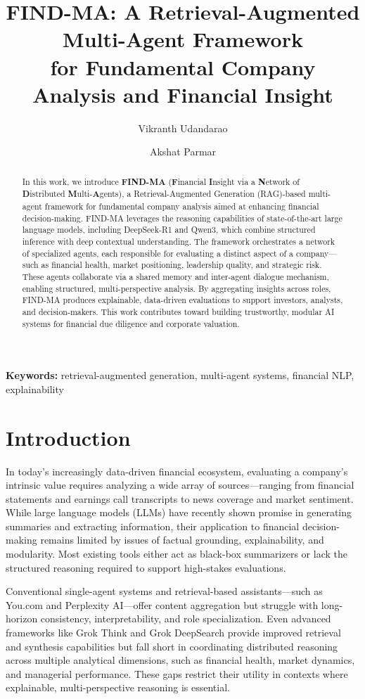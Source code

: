\documentclass[11pt]{article}
\title{FIND-MA: A Retrieval-Augmented Multi-Agent Framework\\
for Fundamental Company Analysis and Financial Insight}
\author[1]{Vikranth Udandarao}
\author[1]{Akshat Parmar}
\affil[1]{IIIT Delhi, India}
\affil[ ]{\texttt{\{vikranth22570, akshat22050\}@iiitd.ac.in}}
\date{} %
\newcommand{\findma}{\textsc{FIND-MA}}
\begin{document}
\maketitle
\thispagestyle{firstpage}

\begin{abstract}
In this work, we introduce \textbf{\findma{}} (\textbf{F}inancial \textbf{I}nsight via a \textbf{N}etwork of \textbf{D}istributed \textbf{M}ulti-\textbf{A}gents), a Retrieval-Augmented Generation (RAG)-based multi-agent framework for fundamental company analysis aimed at enhancing financial decision-making. \findma{} leverages the reasoning capabilities of state-of-the-art large language models, including DeepSeek-R1 and Qwen3, which combine structured inference with deep contextual understanding. The framework orchestrates a network of specialized agents, each responsible for evaluating a distinct aspect of a company—such as financial health, market positioning, leadership quality, and strategic risk. These agents collaborate via a shared memory and inter-agent dialogue mechanism, enabling structured, multi-perspective analysis. By aggregating insights across roles, \findma{} produces explainable, data-driven evaluations to support investors, analysts, and decision-makers. This work contributes toward building trustworthy, modular AI systems for financial due diligence and corporate valuation.
\end{abstract}

\textbf{Keywords:} retrieval-augmented generation, multi-agent systems, financial NLP, explainability

\section{Introduction}
\label{sec:intro}
In today’s increasingly data-driven financial ecosystem, evaluating a company’s intrinsic value requires analyzing a wide array of sources—ranging from financial statements and earnings call transcripts to news coverage and market sentiment. While large language models (LLMs) have recently shown promise in generating summaries and extracting information, their application to financial decision-making remains limited by issues of factual grounding, explainability, and modularity. Most existing tools either act as black-box summarizers or lack the structured reasoning required to support high-stakes evaluations.

Conventional single-agent systems and retrieval-based assistants—such as You.com and Perplexity AI—offer content aggregation but struggle with long-horizon consistency, interpretability, and role specialization. Even advanced frameworks like Grok Think and Grok DeepSearch provide improved retrieval and synthesis capabilities but fall short in coordinating distributed reasoning across multiple analytical dimensions, such as financial health, market dynamics, and managerial performance. These gaps restrict their utility in contexts where explainable, multi-perspective reasoning is essential.
\end{document}
